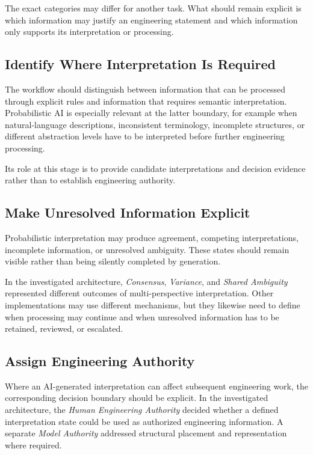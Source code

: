 The exact categories may differ for another task. What should remain explicit is which
information may justify an engineering statement and which information only supports its
interpretation or processing.

\subsection{Identify Where Interpretation Is Required}
\label{sec:path_interpretation}

The workflow should distinguish between information that can be processed through explicit
rules and information that requires semantic interpretation. Probabilistic AI is especially
relevant at the latter boundary, for example when natural-language descriptions,
inconsistent terminology, incomplete structures, or different abstraction levels have to be
interpreted before further engineering processing.

Its role at this stage is to provide candidate interpretations and decision evidence rather
than to establish engineering authority.

\subsection{Make Unresolved Information Explicit}
\label{sec:path_uncertainty}

Probabilistic interpretation may produce agreement, competing interpretations, incomplete
information, or unresolved ambiguity. These states should remain visible rather than being
silently completed by generation.

In the investigated architecture, \emph{Consensus}, \emph{Variance}, and
\emph{Shared Ambiguity} represented different outcomes of multi-perspective interpretation.
Other implementations may use different mechanisms, but they likewise need to define when
processing may continue and when unresolved information has to be retained, reviewed, or
escalated.

\subsection{Assign Engineering Authority}
\label{sec:path_authority}

Where an AI-generated interpretation can affect subsequent engineering work, the
corresponding decision boundary should be explicit. In the investigated architecture, the
\emph{Human Engineering Authority} decided whether a defined interpretation state could be
used as authorized engineering information. A separate \emph{Model Authority} addressed
structural placement and representation where required.

